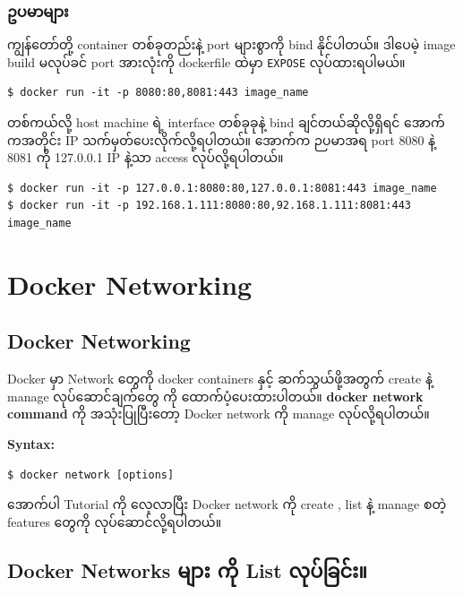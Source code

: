 \documentclass{article}
\begin{document}
\subsubsection{ဥပမာများ}\label{ux1025ux1015ux1019ux1019}

ကျွန်တော်တို့ container တစ်ခုတည်းနဲ့ port များစွာကို bind နိုင်ပါတယ်။
ဒါပေမဲ့ image build မလုပ်ခင် port အားလုံးကို dockerfile ထဲမှာ
\texttt{EXPOSE} လုပ်ထားရပါမယ်။

\begin{verbatim}
$ docker run -it -p 8080:80,8081:443 image_name
\end{verbatim}

တစ်ကယ်လို့ host machine ရဲ့ interface တစ်ခုခုနဲ့ bind
ချင်တယ်ဆိုလို့ရှိရင် အောက်ကအတိုင်း IP သက်မှတ်ပေးလိုက်လို့ရပါတယ်။ အောက်က
ဉပမာအရ port 8080 နဲ့ 8081 ကို 127.0.0.1 IP နဲ့သာ access လုပ်လို့ရပါတယ်။

\begin{verbatim}
$ docker run -it -p 127.0.0.1:8080:80,127.0.0.1:8081:443 image_name
$ docker run -it -p 192.168.1.111:8080:80,92.168.1.111:8081:443 image_name
\end{verbatim}

\pagebreak

\section{Docker Networking}\label{docker-networking}

\subsection{Docker Networking}\label{docker-networking-1}

Docker မှာ Network တွေကို docker containers နှင့် ဆက်သွယ်ဖို့အတွက်
create နဲ့ manage လုပ်ဆောင်ချက်တွေ ကို ထောက်ပံ့ပေးထားပါတယ်။
\textbf{docker network command} ကို အသုံးပြုပြီးတော့ Docker network ကို
manage လုပ်လို့ရပါတယ်။

\textbf{Syntax:}

\begin{verbatim}
$ docker network [options]
\end{verbatim}

အောက်ပါ Tutorial ကို လေ့လာပြီး Docker network ကို create , list နဲ့
manage စတဲ့ features တွေကို လုပ်ဆောင်လို့ရပါတယ်။

\subsection{Docker Networks များ ကို List
လုပ်ခြင်း။}\label{docker-networks---list-}
\end{document}
